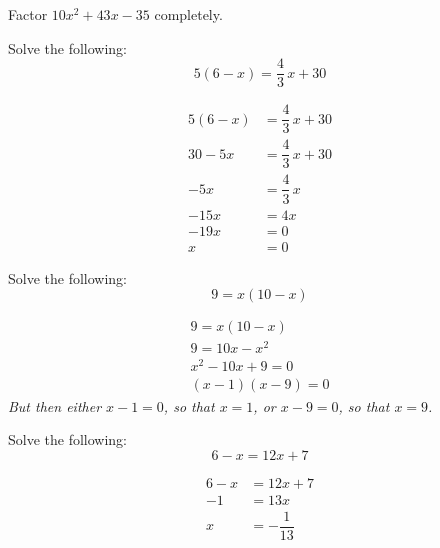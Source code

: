 \documentclass[12pt,letterpaper]{exam}
\begin{document}
\begin{questions}



\newpage
\question[10] Factor $10x^2 + 43x - 35$ completely. 



\newpage
\question[10] Solve the following:
	\[
	5(6 - x)= \dfrac{4}{3}\,x + 30
	\] \pspace

	\[
	\begin{aligned}
	5(6 - x)&= \dfrac{4}{3}\,x + 30 \\[0.3cm]
	30 - 5x&= \dfrac{4}{3}\,x + 30 \\[0.3cm]
	-5x&= \dfrac{4}{3}\,x \\[0.3cm]
	-15x&= 4x \\[0.3cm]
	-19x&= 0 \\[0.3cm]
	x&= 0
	\end{aligned}
	\]



\newpage
\question[10] Solve the following:
	\[
	9= x(10 - x)
	\] \pspace

{\itshape
	\[
	\begin{aligned}
	9= x(10 - x) \\[0.3cm]
	9= 10x - x^2 \\[0.3cm]
	x^2 - 10x + 9= 0 \\[0.3cm]
	(x - 1)(x - 9)= 0
	\end{aligned}
	\] \pspace
But then either $x - 1=0$, so that $x= 1$, or $x - 9=0$, so that $x= 9$.}



\newpage
\question[10] Solve the following:
	\[
	6 - x= 12x + 7
	\] \pspace

	\[
	\begin{aligned}
	6 - x&= 12x + 7 \\[0.3cm]
	-1&= 13x \\[0.3cm]
	x&= -\dfrac{1}{13}
	\end{aligned}
	\] 




\end{questions}
\end{document}
